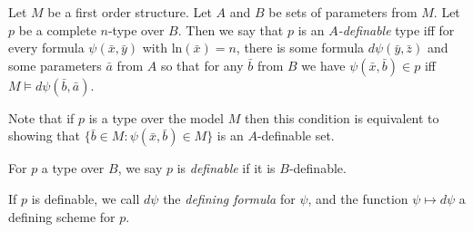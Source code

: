 \documentclass[12pt]{article}
\begin{document}
Let $M$ be a first order structure. 
Let $A$ and $B$ be sets of parameters from $M$.
Let $p$ be a complete $n$-type over $B$. 
Then we say that $p$ is an {\em $A$-definable} type iff 
for every formula $\psi(\bar{x},\bar{y})$ with ln$(\bar{x})=n$, 
there is some formula $d\psi(\bar{y},\bar{z})$ and some parameters $\bar{a}$ from $A$ so that
for any $\bar{b}$ from $B$ we have $\psi(\bar{x},\bar{b}) \in p$ iff $M \models d\psi(\bar{b},\bar{a})$.

Note that if $p$ is a type over the model $M$ then this condition is equivalent to showing that $\{\bar{b} \in M:\psi(\bar{x},\bar{b}) \in M\}$ is an $A$-definable set.

\medskip

For $p$ a type over $B$, we say $p$ is {\em definable} if it is $B$-definable.

\medskip

If $p$ is definable, we call $d\psi$ the {\em defining formula} for $\psi$, and the function $\psi \mapsto d\psi$ a defining scheme for $p$.
\end{document}
